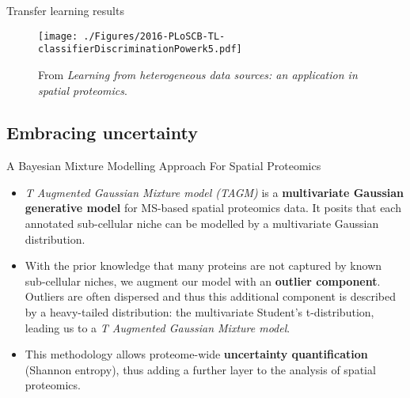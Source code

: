 \begin{frame}{Transfer learning results}

  \begin{figure}[h]
    \centering
    \texttt{[image: ./Figures/2016-PLoSCB-TL-classifierDiscriminationPowerk5.pdf]}
    \caption{{\footnotesize From \cite{Breckels:2016} \textit{Learning from
          heterogeneous data sources: an application in spatial
          proteomics}.}
    }
\label{fig:tlres}
  \end{figure}

\end{frame}

\subsection{Embracing uncertainty}

\begin{frame}{A Bayesian Mixture Modelling Approach For Spatial Proteomics}

  \begin{itemize}

    \item<+-> \textit{T Augmented Gaussian Mixture model (TAGM)} is a
      \textbf{multivariate Gaussian generative model} for MS-based
      spatial proteomics data. It posits that each annotated
      sub-cellular niche can be modelled by a multivariate Gaussian
      distribution.

    \item<+-> With the prior knowledge that many proteins are not
      captured by known sub-cellular niches, we augment our model with
      an \textbf{outlier component}. Outliers are often dispersed and
      thus this additional component is described by a heavy-tailed
      distribution: the multivariate Student's t-distribution, leading
      us to a \textit{T Augmented Gaussian Mixture model}.

    \item<+-> This methodology allows proteome-wide
      \textbf{uncertainty quantification} (Shannon entropy), thus
      adding a further layer to the analysis of spatial proteomics.

  \end{itemize}
\end{frame}

